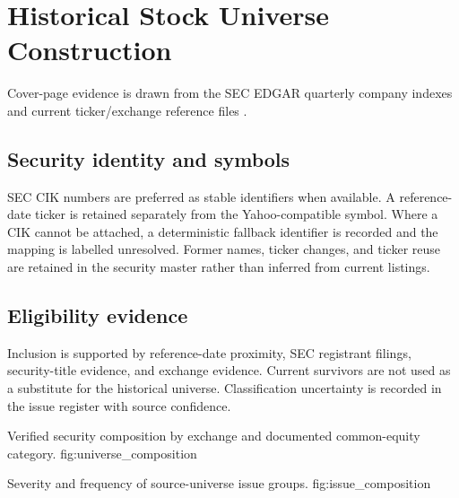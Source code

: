 \section{Historical Stock Universe Construction}


Cover-page evidence is drawn from the SEC EDGAR quarterly company indexes and
current ticker/exchange reference files \citep{sec2023index,seccompanytickers}.

\subsection{Security identity and symbols}

SEC CIK numbers are preferred as stable identifiers when available. A
reference-date ticker is retained separately from the Yahoo-compatible symbol.
Where a CIK cannot be attached, a deterministic fallback identifier is recorded
and the mapping is labelled unresolved. Former names, ticker changes, and
ticker reuse are retained in the security master rather than inferred from
current listings.

\subsection{Eligibility evidence}

Inclusion is supported by reference-date proximity, SEC registrant filings,
security-title evidence, and exchange evidence. Current survivors are not used
as a substitute for the historical universe. Classification uncertainty is
recorded in the issue register with source confidence.




  {Verified security composition by exchange and documented common-equity category.}
  {fig:universe_composition}

  {Severity and frequency of source-universe issue groups.}
  {fig:issue_composition}
